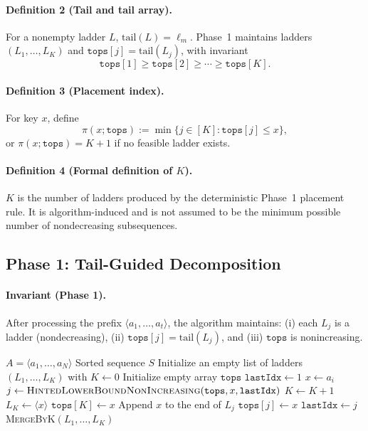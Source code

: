\documentclass[10pt]{article}
\begin{document}
\paragraph{Definition 2 (Tail and tail array).}
For a nonempty ladder \(L\), \(\mathrm{tail}(L)=\ell_m\). Phase~1 maintains ladders \((L_1,\dots,L_K)\) and \(\texttt{tops}[j]=\mathrm{tail}(L_j)\), with invariant
\[
\texttt{tops}[1] \ge \texttt{tops}[2] \ge \cdots \ge \texttt{tops}[K].
\]

\paragraph{Definition 3 (Placement index).}
For key \(x\), define
\[
\pi(x; \texttt{tops}) := \min\{ j \in [K] : \texttt{tops}[j] \le x \},
\]
or \(\pi(x;\texttt{tops})=K+1\) if no feasible ladder exists.

\paragraph{Definition 4 (Formal definition of \(K\)).}
\(K\) is the number of ladders produced by the deterministic Phase~1 placement rule. It is algorithm-induced and is not assumed to be the minimum possible number of nondecreasing subsequences.

\subsection{\textbf{Phase 1: Tail-Guided Decomposition}}

\paragraph{Invariant (Phase 1).}
After processing the prefix $\langle a_1,\dots,a_t\rangle$, the algorithm maintains:
(i) each $L_j$ is a ladder (nondecreasing),
(ii) $\texttt{tops}[j]=\mathrm{tail}(L_j)$, and
(iii) $\texttt{tops}$ is nonincreasing.

\begin{algorithm}[H]
\caption{\textsc{LadderSort}$(A)$ (formal)}
\label{alg:laddersort}
\begin{algorithmic}[1]
\Require $A=\langle a_1,\dots,a_N\rangle$
\Ensure Sorted sequence $S$
\State Initialize an empty list of ladders $(L_1,\dots,L_K)$ with $K\gets 0$
\State Initialize empty array $\texttt{tops}$
\State $\texttt{lastIdx} \gets 1$ 
    \State $x \gets a_i$
    \State $j \gets \textsc{HintedLowerBoundNonIncreasing}(\texttt{tops}, x, \texttt{lastIdx})$
        \State $K \gets K+1$
        \State $L_K \gets \langle x\rangle$
        \State $\texttt{tops}[K] \gets x$
    \Else
        \State Append $x$ to the end of $L_j$
        \State $\texttt{tops}[j] \gets x$
    \EndIf
    \State $\texttt{lastIdx} \gets j$
\EndFor
\State \Return \textsc{MergeByK}$(L_1,\dots,L_K)$
\end{algorithmic}
\end{algorithm}
\end{document}
